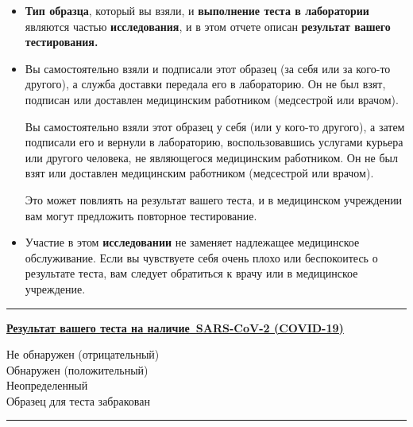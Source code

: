 \documentclass[10pt]{article}
\newcommand{\PageLine}{\rule{\textwidth}{0.25mm}}
\begin{document}
\begin{itemize}
\item

  \textbf{Тип образца}, который вы взяли, и \textbf{выполнение теста в
  лаборатории} являются частью \textbf{исследования}, и в этом отчете описан
  \textbf{результат вашего тестирования.}

\item
  Вы самостоятельно взяли и подписали этот образец (за себя или за кого-то
  другого), а служба доставки передала его в лабораторию. Он не был взят,
  подписан или доставлен медицинским работником (медсестрой или врачом).

  Вы самостоятельно взяли этот образец у себя (или у кого-то другого), а затем
  подписали его и вернули в лабораторию, воспользовавшись услугами курьера или
  другого человека, не являющегося медицинским работником. Он не был взят или
  доставлен медицинским работником (медсестрой или врачом). 



  Это может повлиять на результат вашего теста, и в медицинском учреждении вам
  могут предложить повторное тестирование.

\item

  Участие в этом \textbf{исследовании} не заменяет надлежащее медицинское
  обслуживание. Если вы чувствуете себя очень плохо или беспокоитесь о
  результате теста, вам следует обратиться к врачу или в медицинское учреждение.

\end{itemize}

\bigskip
\PageLine

\large \underline{\textbf{Результат вашего теста на наличие SARS-CoV-2 (COVID-19)}}

Не обнаружен (отрицательный)\\
Обнаружен (положительный)\\
Неопределенный\\
Образец для теста забракован\\

\PageLine
\bigskip
\end{document}

